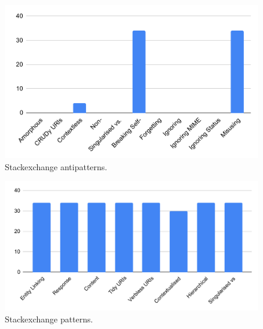 \documentclass[a4paper,12pt]{article}
\begin{document}
\begin{figure}[!h]
\begin{center}
\includegraphics[keepaspectratio,scale=0.8]{Template_report_LaTeX_EN/img/barchart/stackexchangeBarAnti.pdf}
\caption{Stackexchange antipatterns.}
\label{fig:StackexchangeBarAnti}
\end{center}
\end{figure}

\begin{figure}[!h]
\begin{center}
\includegraphics[keepaspectratio,scale=0.8]{Template_report_LaTeX_EN/img/barchart/stackexchangeBarPatt.pdf}
\caption{Stackexchange patterns.}
\label{fig:StackexchangeBarPatt}
\end{center}
\end{figure}
\end{document}

